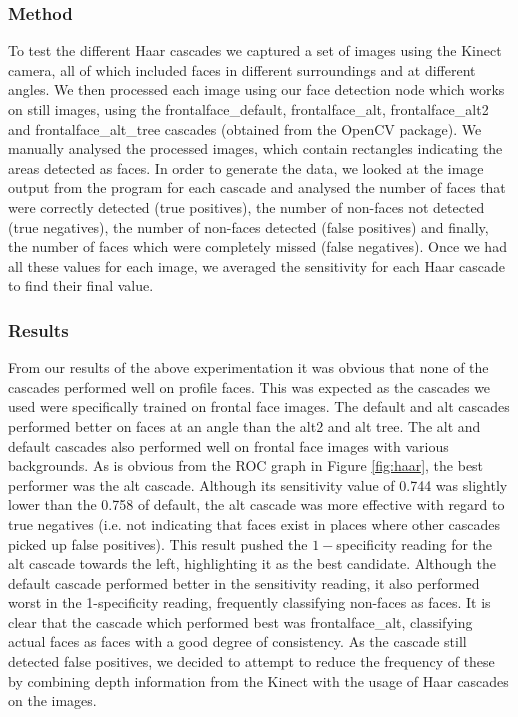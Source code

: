 \documentclass[conference]{IEEEtran}
\begin{document}
\subsubsection{Method}
To test the different Haar cascades we captured a set of images using the Kinect camera, all of which included faces in different surroundings and at different angles. We then processed each image using our face detection node which works on still images, using the frontalface\_default, frontalface\_alt, frontalface\_alt2 and frontalface\_alt\_tree cascades (obtained from the OpenCV package). We manually analysed the processed images, which contain rectangles indicating the areas detected as faces. In order to generate the data, we looked at the image output from the program for each cascade and analysed the number of faces that were correctly detected (true positives), the number of non-faces not detected (true negatives), the number of non-faces detected (false positives) and finally, the number of faces which were completely missed (false negatives). Once we had all these values for each image, we averaged the sensitivity for each Haar cascade to find their final value.
\subsubsection{Results}
From our results of the above experimentation it was obvious that none of the cascades performed well on profile faces. This was expected as the cascades we used were specifically trained on frontal face images. The default and alt cascades performed better on faces at an angle than the alt2 and alt tree. The alt and default cascades also performed well on frontal face images with various backgrounds. As is obvious from the ROC graph in Figure \ref{fig:haar}, the best performer was the alt cascade. Although its sensitivity value of 0.744 was slightly  lower than the 0.758 of default, the alt cascade was more effective with regard to true negatives (i.e. not indicating that faces exist in places where other cascades picked up false positives). This result pushed the $1-$specificity reading for the alt cascade towards the left, highlighting it as the best candidate. Although the default cascade performed better in the sensitivity reading, it also performed worst in the 1-specificity reading, frequently classifying non-faces as faces. It is clear that the cascade which performed best was frontalface\_alt, classifying actual faces as faces with a good degree of consistency. As the cascade still detected false positives, we decided to attempt to reduce the frequency of these by combining depth information from the Kinect with the usage of Haar cascades on the images.
\end{document}
